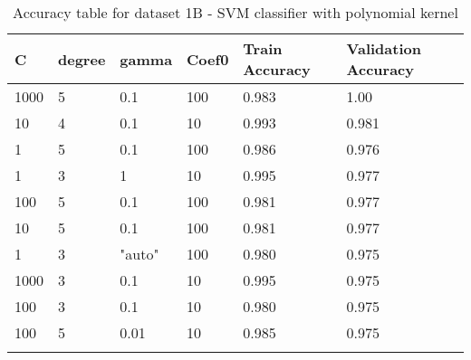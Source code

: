 \def\arraystretch{1.25}
\begin{longtable}{l l l l l l}
\hline
\hline
\textbf{C} & \textbf{degree} & \textbf{gamma} & \textbf{Coef0} & \textbf{Train Accuracy} & \textbf{Validation Accuracy}\\
\hline
\hline
1000 & 5 & 0.1 & 100 & 0.983 & 1.00 \\
10 & 4 & 0.1 & 10 & 0.993 & 0.981 \\
1 & 5 & 0.1 & 100 & 0.986 & 0.976  \\
1 & 3 & 1 & 10 & 0.995 & 0.977 \\
100 & 5 & 0.1 & 100 & 0.981 & 0.977 \\
10 & 5 & 0.1 & 100 & 0.981 & 0.977 \\
1 & 3 & "auto" & 100 & 0.980 & 0.975 \\
1000 & 3 & 0.1 & 10 & 0.995 & 0.975 \\
100 & 3 & 0.1 & 10 & 0.980 & 0.975 \\
100 & 5 & 0.01 & 10 & 0.985 & 0.975 \\

\hline
\caption{Accuracy table for dataset 1B - SVM classifier with polynomial kernel}
\end{longtable}
